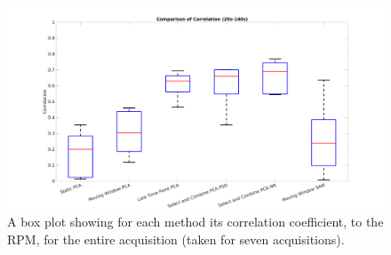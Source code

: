     \begin{figure}
        
        \centering
        
        \includegraphics[width=1.0\linewidth]{figures/box_plot_early.png}
        
        
        \captionsetup{singlelinecheck=false, justification=centering}
        \caption{
        A box plot showing for each method its correlation coefficient, to the \gls{RPM}, for the entire acquisition (taken for seven acquisitions).}
        
        \label{fig:box_plot_early}
        
    \end{figure}
    
